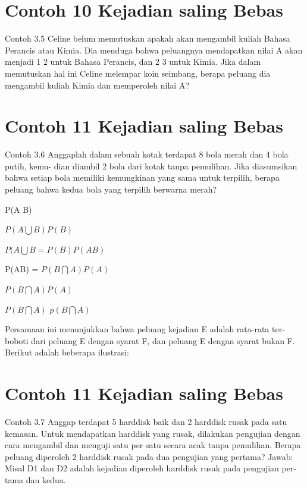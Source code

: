\documentclass[11pt,fleqn]{book} %
\begin{document}
{{\section{Contoh 10 Kejadian saling Bebas}
Contoh 3.5 Celine belum memutuskan apakah akan mengambil kuliah Bahasa Perancis atau Kimia. Dia menduga bahwa peluangnya mendapatkan nilai A akan menjadi 1 2 untuk Bahasa Perancis, dan 2 3 untuk Kimia. Jika dalam memutuskan hal ini Celine melempar koin seimbang, berapa peluang dia mengambil kuliah Kimia dan memperoleh nilai A?
\vspace{0.5in}
\section{Contoh 11 Kejadian saling Bebas}
Contoh 3.6 Anggaplah dalam sebuah kotak terdapat 8 bola merah dan 4 bola putih, kemu- dian diambil 2 bola dari kotak tanpa pemulihan. Jika diasumsikan bahwa setiap bola memiliki kemungkinan yang sama untuk terpilih, berapa peluang bahwa kedua bola yang terpilih berwarna merah?

\vspace{0.5in}


P(A B)

$ P(A \bigcup B) P(B) $ 

$ P(A \bigcup B = P(B)P(AB) $

P(AB) = $ P(B \bigcap A)P(A) $

$ P(B\bigcap A) P(A) $

$ P(B \bigcap A) $ $ p(B \bigcap A) $

\vspace{0.5in}

Persamaan ini menunjukkan bahwa peluang kejadian E adalah rata-rata ter- boboti dari peluang E dengan syarat F, dan peluang E dengan syarat bukan F. Berikut adalah beberapa ilustrasi:

\vspace{0.5in}

\section{Contoh 11 Kejadian saling Bebas}
Contoh 3.7 Anggap terdapat 5 harddisk baik dan 2 harddisk rusak pada satu kemasan. Untuk mendapatkan harddisk yang rusak, dilakukan pengujian dengan cara mengambil dan menguji satu per satu secara acak tanpa pemulihan. Berapa peluang diperoleh 2 harddisk rusak pada dua pengujian yang pertama? Jawab: Misal D1 dan D2 adalah kejadian diperoleh harddisk rusak pada pengujian per- tama dan kedua.


}}
\end{document}
